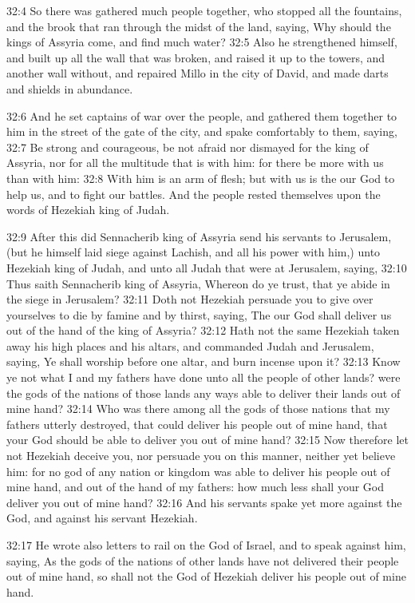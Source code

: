 32:4 So there was gathered much people together, who stopped all the
fountains, and the brook that ran through the midst of the land,
saying, Why should the kings of Assyria come, and find much water?
32:5 Also he strengthened himself, and built up all the wall that was
broken, and raised it up to the towers, and another wall without, and
repaired Millo in the city of David, and made darts and shields in
abundance.

32:6 And he set captains of war over the people, and gathered them
together to him in the street of the gate of the city, and spake
comfortably to them, saying, 32:7 Be strong and courageous, be not
afraid nor dismayed for the king of Assyria, nor for all the multitude
that is with him: for there be more with us than with him: 32:8 With
him is an arm of flesh; but with us is the \LORD our God to help us,
and to fight our battles. And the people rested themselves upon the
words of Hezekiah king of Judah.

32:9 After this did Sennacherib king of Assyria send his servants to
Jerusalem, (but he himself laid siege against Lachish, and all his
power with him,) unto Hezekiah king of Judah, and unto all Judah that
were at Jerusalem, saying, 32:10 Thus saith Sennacherib king of
Assyria, Whereon do ye trust, that ye abide in the siege in Jerusalem?
32:11 Doth not Hezekiah persuade you to give over yourselves to die by
famine and by thirst, saying, The \LORD our God shall deliver us out of
the hand of the king of Assyria?  32:12 Hath not the same Hezekiah
taken away his high places and his altars, and commanded Judah and
Jerusalem, saying, Ye shall worship before one altar, and burn incense
upon it?  32:13 Know ye not what I and my fathers have done unto all
the people of other lands? were the gods of the nations of those lands
any ways able to deliver their lands out of mine hand?  32:14 Who was
there among all the gods of those nations that my fathers utterly
destroyed, that could deliver his people out of mine hand, that your
God should be able to deliver you out of mine hand?  32:15 Now
therefore let not Hezekiah deceive you, nor persuade you on this
manner, neither yet believe him: for no god of any nation or kingdom
was able to deliver his people out of mine hand, and out of the hand
of my fathers: how much less shall your God deliver you out of mine
hand?  32:16 And his servants spake yet more against the \LORD God, and
against his servant Hezekiah.

32:17 He wrote also letters to rail on the \LORD God of Israel, and to
speak against him, saying, As the gods of the nations of other lands
have not delivered their people out of mine hand, so shall not the God
of Hezekiah deliver his people out of mine hand.

